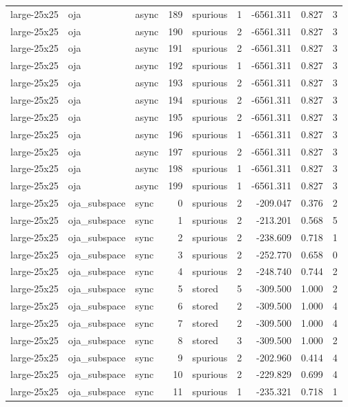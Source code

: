 \begin{tabular}{lllrlrrrr}
large-25x25 & oja & async & 189 & spurious & 1 & -6561.311 & 0.827 & 3 \\
large-25x25 & oja & async & 190 & spurious & 2 & -6561.311 & 0.827 & 3 \\
large-25x25 & oja & async & 191 & spurious & 2 & -6561.311 & 0.827 & 3 \\
large-25x25 & oja & async & 192 & spurious & 1 & -6561.311 & 0.827 & 3 \\
large-25x25 & oja & async & 193 & spurious & 2 & -6561.311 & 0.827 & 3 \\
large-25x25 & oja & async & 194 & spurious & 2 & -6561.311 & 0.827 & 3 \\
large-25x25 & oja & async & 195 & spurious & 2 & -6561.311 & 0.827 & 3 \\
large-25x25 & oja & async & 196 & spurious & 1 & -6561.311 & 0.827 & 3 \\
large-25x25 & oja & async & 197 & spurious & 2 & -6561.311 & 0.827 & 3 \\
large-25x25 & oja & async & 198 & spurious & 1 & -6561.311 & 0.827 & 3 \\
large-25x25 & oja & async & 199 & spurious & 1 & -6561.311 & 0.827 & 3 \\
large-25x25 & oja\_subspace & sync & 0 & spurious & 2 & -209.047 & 0.376 & 2 \\
large-25x25 & oja\_subspace & sync & 1 & spurious & 2 & -213.201 & 0.568 & 5 \\
large-25x25 & oja\_subspace & sync & 2 & spurious & 2 & -238.609 & 0.718 & 1 \\
large-25x25 & oja\_subspace & sync & 3 & spurious & 2 & -252.770 & 0.658 & 0 \\
large-25x25 & oja\_subspace & sync & 4 & spurious & 2 & -248.740 & 0.744 & 2 \\
large-25x25 & oja\_subspace & sync & 5 & stored & 5 & -309.500 & 1.000 & 2 \\
large-25x25 & oja\_subspace & sync & 6 & stored & 2 & -309.500 & 1.000 & 4 \\
large-25x25 & oja\_subspace & sync & 7 & stored & 2 & -309.500 & 1.000 & 4 \\
large-25x25 & oja\_subspace & sync & 8 & stored & 3 & -309.500 & 1.000 & 2 \\
large-25x25 & oja\_subspace & sync & 9 & spurious & 2 & -202.960 & 0.414 & 4 \\
large-25x25 & oja\_subspace & sync & 10 & spurious & 2 & -229.829 & 0.699 & 4 \\
large-25x25 & oja\_subspace & sync & 11 & spurious & 1 & -235.321 & 0.718 & 1 \\

\end{tabular}
